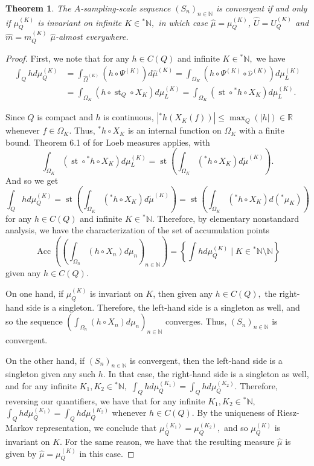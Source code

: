 \documentclass{amsart}
\newtheorem{thm}{Theorem}[section]
\theoremstyle{definition}
\theoremstyle{remark}
\def \St{\operatorname{st}}
\def \HOM{\hat{\Omega}}
\def \HMU{\hat{\mu}}
\def \HNU{\hat{\nu}}
\def \HU{\hat{U}}
\def \Hm{\hat{m}}
\begin{document}
\begin{thm}
 The $A$-sampling-scale sequence $(S_n)_{n\in\mathbb{N}}$ is convergent if and only if $\mu_Q^{(K)}$ is invariant on infinite $K\in{}^*\mathbb{N},$ in which case $\HMU=\mu_Q^{(K)}$, $\HU=U_Q^{(K)}$ and $\Hm=m_Q^{(K)}$ $\HMU$-almost everywhere.
\end{thm}
\begin{proof}
	First, we note that for any $h\in C(Q)$ and  infinite $K\in{}^*\mathbb{N},$ we have 
	\begin{align*}
		\int_Q hd\mu_Q^{(K)}&=\int_{\HOM^{(K)}}(h\circ \Psi^{(K)})d\HMU^{(K)}=\int_{\Omega_K}(h\circ \Psi^{(K)}\circ \HNU^{(K)})d\mu_L^{(K)}\\
		&=\int_{\Omega_K}(h\circ \St_Q\circ X_K)d\mu_L^{(K)}=\int_{\Omega_K}(\St\circ {}^*h\circ X_K)d\mu_L^{(K)}.
	\end{align*}
	
	Since $Q$ is compact and $h$ is continuous, $|{}^*h(X_K(f))|\leq \max_Q(|h|)\in\mathbb{R}$ whenever $f\in\Omega_K.$ Thus, ${}^*h\circ X_K$ is an internal function on $\Omega_K$ with a finite bound. Theorem 6.1 of \cite{Ross1997} for Loeb measures applies, with $$\int_{\Omega_K}(\St\circ {}^*h\circ X_K)d\mu_L^{(K)}=\St\left(\int_{\Omega_K}({}^*h\circ X_K)d\tilde{\mu}^{(K)}\right).$$ And so we get $$\int_Q hd\mu_Q^{(K)}=\St\left(\int_{\Omega_K}({}^*h\circ X_K)d\tilde{\mu}^{(K)}\right)=\St\left(\int_{\Omega_K}({}^*h\circ X_K)d({}^*\mu_K)\right) $$ for any $h\in C(Q)$ and infinite $K\in{}^*\mathbb{N}.$ Therefore, by elementary nonstandard analysis, we have the characterization of the set of accumulation points $$\operatorname{Acc}\left(\left(\int_{\Omega_n}(h\circ X_n)d\mu_n\right)_{n\in\mathbb{N}}\right)=\left\{\int hd\mu_Q^{(K)}\;|\; K\in{}^*\mathbb{N}\setminus\mathbb{N} \right\}$$ given any $h\in C(Q).$ 
	
	On one hand, if $\mu_Q^{(K)}$ is invariant on $K$, then given any $h\in C(Q),$ the right-hand side is a singleton. Therefore, the left-hand side is a singleton as well, and so the sequence $\left(\int_{\Omega_n}(h\circ X_n)d\mu_n\right)_{n\in\mathbb{N}}$ converges. Thus, $(S_n)_{n\in\mathbb{N}}$ is convergent.
	
	On the other hand, if $(S_n)_{n\in\mathbb{N}}$ is convergent, then the left-hand side is a singleton given any such $h$. In that case, the right-hand side is a singleton as well, and for any infinite $K_1, K_2\in{}^*\mathbb{N},$ $\int_Qhd\mu_Q^{(K_1)}=\int_Qhd\mu_Q^{(K_2)}$. Therefore, reversing our quantifiers, we have that for any infinite $K_1, K_2\in{}^*\mathbb{N},$ $\int_Qhd\mu_Q^{(K_1)}=\int_Qhd\mu_Q^{(K_2)}$ whenever $h\in C(Q).$ By the uniqueness of Riesz-Markov representation, we conclude that $\mu_Q^{(K_1)}=\mu_Q^{(K_2)},$ and so $\mu_Q^{(K)}$ is invariant on $K$. For the same reason, we have that the resulting measure $\HMU$ is given by $\HMU=\mu_Q^{(K)}$ in this case. 
	

\end{proof}
\end{document}
